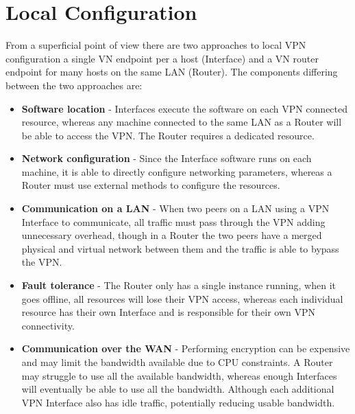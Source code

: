 \section{Local Configuration}
From a superficial point of view there are two approaches to local VPN
configuration a single VN endpoint per a host (Interface) and a VN router
endpoint for many hosts on the same LAN (Router).  The components differing
between the two approaches are:
\begin{itemize}
\item \textbf{Software location} - Interfaces execute the software on each VPN
connected resource, whereas any machine connected to the same LAN as a Router
will be able to access the VPN.  The Router requires a dedicated resource.
\item \textbf{Network configuration} - Since the Interface software runs on
each machine, it is able to directly configure networking parameters, whereas a
Router must use external methods to configure the resources.
\item \textbf{Communication on a LAN} - When two peers on a LAN using a VPN
Interface to communicate, all traffic must pass through the VPN adding
unnecessary overhead, though in a Router the two peers have a merged physical
and virtual network between them and the traffic is able to bypass the VPN.
\item \textbf{Fault tolerance} - The Router only has a single instance running,
when it goes offline, all resources will lose their VPN access, whereas each
individual resource has their own Interface and is responsible for their own
VPN connectivity.
\item \textbf{Communication over the WAN} - Performing encryption can be
expensive and may limit the bandwidth available due to CPU constraints.  A
Router may struggle to use all the available bandwidth, whereas enough
Interfaces will eventually be able to use all the bandwidth.  Although each
additional VPN Interface also has idle traffic, potentially reducing usable
bandwidth.
\end{itemize}

